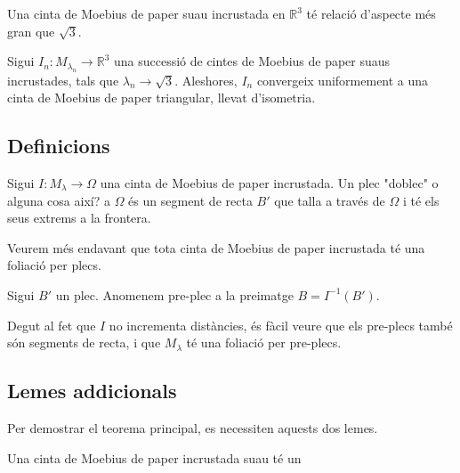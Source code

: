 \begin{teo}[Principal]\label{teo:Main Schwartz}
    Una cinta de Moebius de paper suau incrustada en $\mathbb R^3$ té relació d'aspecte més gran que $\sqrt{3}$.
\end{teo}

\begin{teo}\label{teo:Límit triangular}
    Sigui $I_n:M_{\lambda_n}\to\mathbb R^3$ una successió de cintes de Moebius de paper suaus incrustades, tals que $\lambda_n\to\sqrt{3}$. Aleshores, $I_n$ convergeix uniformement a una cinta de Moebius de paper triangular, llevat d'isometria.
\end{teo}
\subsection{Definicions}
\begin{defi}
    Sigui $I:M_\lambda\to\Omega$ una cinta de Moebius de paper incrustada. Un {\normalfont plec} {\color{blue} "doblec" o alguna cosa així?} a $\Omega$ és un segment de recta $B'$ que talla a través de $\Omega$ i té els seus extrems a la frontera.
\end{defi}
Veurem més endavant que tota cinta de Moebius de paper incrustada té una foliació per plecs.
\begin{defi}
    Sigui $B'$ un plec. Anomenem {\normalfont pre-plec} a la preimatge $B=I^{-1}(B')$.
\end{defi}
Degut al fet que $I$ no incrementa distàncies, és fàcil veure que els pre-plecs també són segments de recta, i que $M_\lambda$ té una foliació per pre-plecs.

\subsection{Lemes addicionals}
Per demostrar el teorema principal, es necessiten aquests dos lemes.
\begin{lema}[T]\label{lema T}
    Una cinta de Moebius de paper incrustada suau té un  

\end{lema}
\newpage